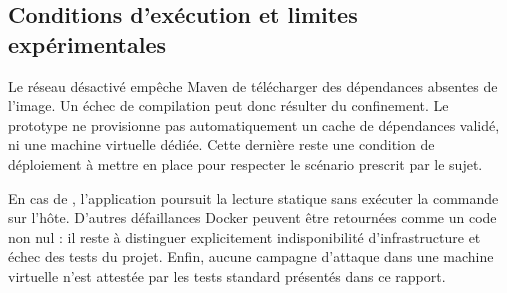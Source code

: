 \subsection{Conditions d'exécution et limites expérimentales}
Le réseau désactivé empêche Maven de télécharger des dépendances absentes de l'image. Un échec de compilation peut donc résulter du confinement. Le prototype ne provisionne pas automatiquement un cache de dépendances validé, ni une machine virtuelle dédiée. Cette dernière reste une condition de déploiement à mettre en place pour respecter le scénario prescrit par le sujet.

En cas de , l'application poursuit la lecture statique sans exécuter la commande sur l'hôte. D'autres défaillances Docker peuvent être retournées comme un code non nul : il reste à distinguer explicitement indisponibilité d'infrastructure et échec des tests du projet. Enfin, aucune campagne d'attaque dans une machine virtuelle n'est attestée par les tests standard présentés dans ce rapport.

\clearpage
